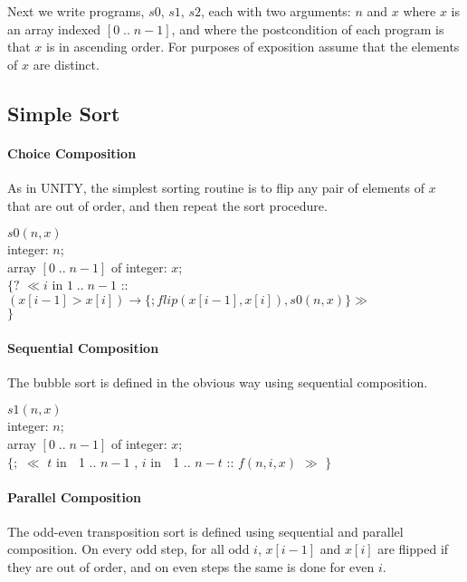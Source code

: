 Next we write programs, $s0$, $s1$, $s2$, each 
with two arguments: $n$ and $x$
where $x$ is an array indexed $[0\;  .. \; n-1]$, 
and where the postcondition of
each program is that $x$ is in ascending order.
For purposes of exposition assume that the elements of $x$ are distinct.

\subsection{Simple Sort}



\paragraph{Choice Composition}
As in UNITY, the simplest sorting routine is to flip any pair
of elements of $x$ that are out of order, and then repeat the sort procedure.

\vspace{5mm}

\noindent
$ s0(n,x) $ \\
integer: $n$; \\
array $[0 \; .. \; n-1]$ of integer: $x$; \\ 
$ \{? $ 
$\ll i$ in $ 1 \; ..  \; n-1 $ :: 
$(x[i-1] > x[i]) \rightarrow \{ ; flip(x[i-1],x[i]), s0(n,x)\}\gg$\\
$\}$


\paragraph{Sequential Composition}
The bubble sort is defined in the obvious way using sequential composition. 

\vspace{5mm}

\noindent
$s1(n,x) $\\
integer: $n$; \\
array $[0 \; .. \; n-1]$ of integer: $x$; \\
$\{;$ 
$\ll$ $t$ in $\;$  1 .. $n-1$ 
, $i$ in  $\;$  1 .. $n-t$ :: $f(n,i,x)$  $\gg$ $\}$ \\

\paragraph{Parallel Composition}
The odd-even transposition sort is defined using sequential and parallel
composition.
On every odd step, for all odd $i$, $x[i-1]$ and $x[i]$ are flipped if they
are out of order, and on even steps the same is done for even $i$.


